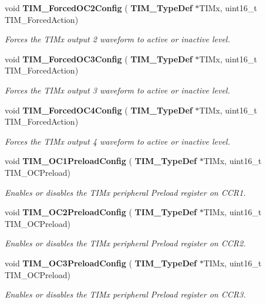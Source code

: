 \begin{DoxyCompactItemize}
void \textbf{ T\+I\+M\+\_\+\+Forced\+O\+C2\+Config} (\textbf{ T\+I\+M\+\_\+\+Type\+Def} $\ast$T\+I\+Mx, uint16\+\_\+t T\+I\+M\+\_\+\+Forced\+Action)
\begin{DoxyCompactList}\small\item\em Forces the T\+I\+Mx output 2 waveform to active or inactive level. \end{DoxyCompactList}\item 
void \textbf{ T\+I\+M\+\_\+\+Forced\+O\+C3\+Config} (\textbf{ T\+I\+M\+\_\+\+Type\+Def} $\ast$T\+I\+Mx, uint16\+\_\+t T\+I\+M\+\_\+\+Forced\+Action)
\begin{DoxyCompactList}\small\item\em Forces the T\+I\+Mx output 3 waveform to active or inactive level. \end{DoxyCompactList}\item 
void \textbf{ T\+I\+M\+\_\+\+Forced\+O\+C4\+Config} (\textbf{ T\+I\+M\+\_\+\+Type\+Def} $\ast$T\+I\+Mx, uint16\+\_\+t T\+I\+M\+\_\+\+Forced\+Action)
\begin{DoxyCompactList}\small\item\em Forces the T\+I\+Mx output 4 waveform to active or inactive level. \end{DoxyCompactList}\item 
void \textbf{ T\+I\+M\+\_\+\+O\+C1\+Preload\+Config} (\textbf{ T\+I\+M\+\_\+\+Type\+Def} $\ast$T\+I\+Mx, uint16\+\_\+t T\+I\+M\+\_\+\+O\+C\+Preload)
\begin{DoxyCompactList}\small\item\em Enables or disables the T\+I\+Mx peripheral Preload register on C\+C\+R1. \end{DoxyCompactList}\item 
void \textbf{ T\+I\+M\+\_\+\+O\+C2\+Preload\+Config} (\textbf{ T\+I\+M\+\_\+\+Type\+Def} $\ast$T\+I\+Mx, uint16\+\_\+t T\+I\+M\+\_\+\+O\+C\+Preload)
\begin{DoxyCompactList}\small\item\em Enables or disables the T\+I\+Mx peripheral Preload register on C\+C\+R2. \end{DoxyCompactList}\item 
void \textbf{ T\+I\+M\+\_\+\+O\+C3\+Preload\+Config} (\textbf{ T\+I\+M\+\_\+\+Type\+Def} $\ast$T\+I\+Mx, uint16\+\_\+t T\+I\+M\+\_\+\+O\+C\+Preload)
\begin{DoxyCompactList}\small\item\em Enables or disables the T\+I\+Mx peripheral Preload register on C\+C\+R3. \end{DoxyCompactList}\item 

\end{DoxyCompactItemize}
